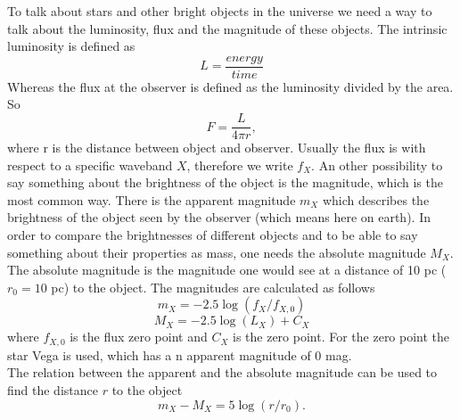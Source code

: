 To talk about stars and other bright objects in the universe we need a way to talk about the luminosity, flux and the magnitude of these objects. The intrinsic luminosity is defined as
\begin{equation}
	L = \frac{energy}{time}
\end{equation}
Whereas the flux at the observer is defined as the luminosity divided by the area. So
\begin{equation}
	F = \frac{L}{4\pi r},
\end{equation}
where r is the distance between object and observer. Usually the flux is with respect to a specific waveband $X$, therefore we write $f_X$. An other possibility to say something about the brightness of the object is the magnitude, which is the most common way. There is the apparent magnitude $m_X$ which describes the brightness of the object seen by the observer (which means here on earth). In order to compare the brightnesses of different objects and to be able to say something about their properties as mass, one needs the absolute magnitude $M_X$. The absolute magnitude is the magnitude one would see at a distance of 10 pc ($r_0 = 10$ pc) to the object. The magnitudes are calculated as follows
\begin{equation}
	m_X = -2.5 \log(f_X/f_{X,0})
\end{equation}
\begin{equation}
	M_X = -2.5 \log(L_X) + C_X
\end{equation}
where $f_{X,0}$ is the flux zero point and $C_X$ is the zero point. For the zero point the star Vega is used, which has a n apparent magnitude of $0$ mag. \\
The relation between the apparent and the absolute magnitude can be used to find the distance $r$ to the object
\begin{equation}
	m_X - M_X = 5\log(r/r_0).
\end{equation}
